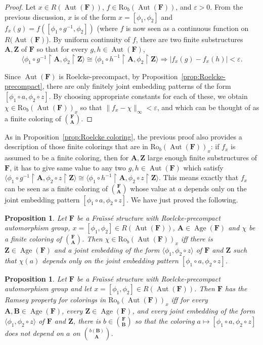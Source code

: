 \documentclass[11pt]{article}
\newtheorem{prop}[theo]{Proposition}
\theoremstyle{definition}
\numberwithin{equation}{section}
\numberwithin{figure}{section}
\numberwithin{table}{section}
\newcommand*{\mA}{\mathbf{A}}
\newcommand*{\mB}{\mathbf{B}}
\newcommand*{\mF}{\mathbf{F}}
\newcommand*{\mZ}{\mathbf{Z}}
\newcommand{\restrict}[2]{#1 \upharpoonright #2}
\newcommand{\e}{\varepsilon}
\DeclareMathOperator{\Aut}{Aut}
\DeclareMathOperator{\Age}{Age}
\newcommand{\ROB}{\mathrm{Ro}_{b}}
\begin{document}
\begin{proof}
Let $x\in R(\Aut(\mF))$, $f\in \ROB(\Aut(\mF))$, and $\e>0$. From the previous discussion, $x$ is of the form $x=[\phi_{1},\phi_{2}]$ and $f_{x}(g)=f([\phi_{1}\circ g^{-1},\phi_{2}])$ (where $f$ is now seen as a continuous function on $R(\Aut(\mF)$). By uniform continuity of $f$, there are two finite substructures $\mA, \mZ$ of $\mF$ so that for every $g,h\in \Aut(\mF)$,
\[
\langle\restrict{\phi_{1}\circ g^{-1}}{\mA}, \restrict{\phi_{2}}{\mZ}\rangle\cong\langle\restrict{\phi_{1}\circ h^{-1}}{\mA}, \restrict{\phi_{2}}{\mZ}\rangle \Rightarrow |f_{x}(g)-f_{x}(h)|<\e.
\]

Since $\Aut(\mF)$ is Roelcke-precompact, by Proposition~\ref{prop:Roelcke-precompact}, there are only finitely joint embedding patterns of the form $[\phi_{1}\circ a, \phi_{2}\circ z]$. By choosing appropriate constants for each of these, we obtain $\chi\in\ROB(\Aut(\mF))_{x}$ so that $\|f_{x}-\chi\|_{\infty}<\e$, and which can be thought of as a finite coloring of $\binom{\mF}{\mA}$.
\end{proof}

As in Proposition~\ref{prop:Roelcke coloring}, the previous proof also provides a description of those finite colorings that are in $\ROB(\Aut(\mF))_{x}$: if $f_{x}$ is assumed to be a finite coloring, then for $\mA, \mZ$ large enough finite substructures of $\mF$, it has to give same value to any two $g, h\in \Aut(\mF)$ which satisfy $\langle\restrict{\phi_{1}\circ g^{-1}}{\mA}, \restrict{\phi_{2}\circ z}{\mZ}\rangle\cong\langle\restrict{\phi_{1}\circ h^{-1}}{\mA}, \restrict{\phi_{2}\circ z}{\mZ}\rangle$. This means exactly that $f_{x}$ can be seen as a finite coloring of $\binom{\mF}{\mA}$ whose value at $a$ depends only on the joint embedding pattern $[\phi_{1}\circ a,\phi_{2}\circ z]$. We have just proved the following.

\begin{prop}\label{prop:Roelcke ext coloring}
Let $\mF$ be a Fra\"{\i}ss\'e structure with Roelcke-precompact automorphism group, $x=[\phi_{1},\phi_{2}]\in R(\Aut(\mF))$, $\mA\in \Age(\mF)$ and $\chi$ be a finite coloring of $\binom{\mF}{\mA}$. Then $\chi\in \ROB(\Aut(\mF))_{x}$ iff there is $\mZ\in \Age(\mF)$ and a joint embedding of the form $\langle \phi_{1}, \phi_{2}\circ z \rangle$ of $\mF$ and $\mZ$ such that $\chi(a)$ depends only on the joint embedding pattern $[\phi_{1}\circ a,\phi_{2}\circ z]$.
\end{prop}

\begin{prop}\label{prop:RPExtRoelcke}
Let $\mF$ be a Fra\"{\i}ss\'e structure with Roelcke-precompact automorphism group and let $x=[\phi_{1},\phi_{2}]\in R(\Aut(\mF))$. Then $\mF$ has the Ramsey property for colorings in $\ROB(\Aut(\mF))_{x}$ iff for every $\mA, \mB \in \Age(\mF)$, every $\mZ\in \Age(\mF)$, and every joint embedding of the form $\langle \phi_{1},\phi_{2}\circ z\rangle$ of $\mF$ and $\mZ$, there is $b\in \binom{\mF}{\mB}$ so that the coloring $a\mapsto [\phi_{1}\circ a,\phi_{2}\circ z]$ does not depend on $a$ on $\binom{b(\mB)}{\mA}$.
\end{prop}
\end{document}
